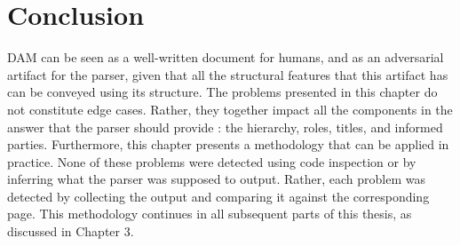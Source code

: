 \section*{Conclusion}
DAM can be seen as a well-written document for humans, and as an adversarial artifact for the parser, given that all the structural features that this artifact has can be conveyed using its structure. The problems presented in this chapter do not constitute edge cases. Rather, they together impact all the components in the answer that the parser should provide : the hierarchy, roles, titles, and informed parties. Furthermore, this chapter presents a methodology that can be applied in practice. None of these problems were detected using code inspection or by inferring what the parser was supposed to output. Rather, each problem was detected by collecting the output and comparing it against the corresponding page. This methodology continues in all subsequent parts of this thesis, as discussed in Chapter 3.
